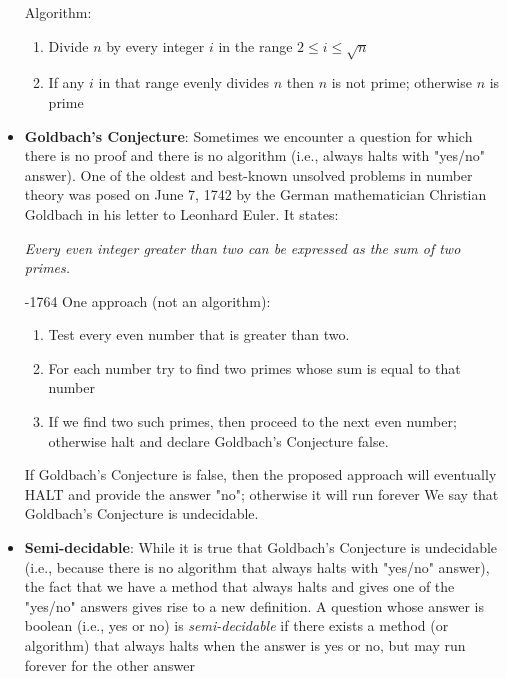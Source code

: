 \documentclass{report}
\begin{document}
\begin{itemize}
            \bigbreak \noindent 
            Algorithm:
            \begin{enumerate}
                \item Divide $n$ by every integer $i$ in the range $2 \leq i \leq \sqrt{n}$
                \item If any $i$ in that range evenly divides $n$ then $n$ is not prime; otherwise $n$ is prime
            \end{enumerate}
        \item \textbf{Goldbach's Conjecture}: Sometimes we encounter a question for which there is no proof and there is no algorithm (i.e., always halts with "yes/no" answer).
            \bigbreak \noindent 
            One of the oldest and best-known unsolved problems in number theory was posed on June 7, 1742 by the German mathematician Christian Goldbach in his letter to Leonhard Euler. It states:
            \bigbreak \noindent 
            \begin{center}
                \textit{Every even integer greater than two can be expressed as the sum of two primes.}
            \end{center}
            \bigbreak {}-1764 One approach (not an algorithm):
            \begin{enumerate}
                \item Test every even number that is greater than two.
                \item For each number try to find two primes whose sum is equal to that number
                \item If we find two such primes, then proceed to the next even number; otherwise halt and declare Goldbach's Conjecture false. 
            \end{enumerate}
            \bigbreak \noindent 
            If Goldbach's Conjecture is false, then the proposed approach will eventually HALT and provide the answer "no"; otherwise it will run forever
            \bigbreak \noindent 
            We say that Goldbach's Conjecture is undecidable.
        \item \textbf{Semi-decidable}: While it is true that Goldbach's Conjecture is undecidable (i.e., because there is no algorithm that always halts with "yes/no" answer), the fact that we have a method that always halts and gives one of the "yes/no" answers gives rise to a new definition.
            \bigbreak \noindent 
            A question whose answer is boolean (i.e., yes or no) is \textit{semi-decidable} if there exists a method (or algorithm) that always halts when the answer is yes or no, but may run forever for the other answer

\end{itemize}
\end{document}

